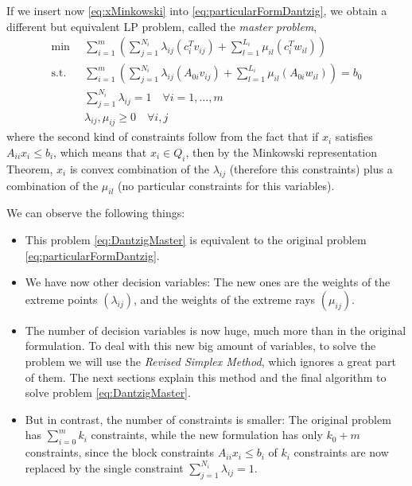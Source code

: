 \documentclass[a4paper,12pt]{article}
\begin{document}
If we insert now \eqref{eq:xMinkowski} into \eqref{eq:particularFormDantzig}, we obtain a different but equivalent LP problem, called the \textit{master problem},
\begin{equation}
\begin{aligned}  
\min \enspace &\sum_{i = 1}^m  \left(\sum_{j=1}^{N_i}  \lambda_{ij}(c_i^Tv_{ij}) + 
	\sum_{l=1}^{L_i} \mu_{il}(c_i^Tw_{il}) \right) \\
\text{s.t.} \enspace &\sum_{i = 1}^m \left(\sum_{j=1}^{N_i}  \lambda_{ij}(A_{0i}v_{ij}) + 	\sum_{l=1}^{L_i} \mu_{il}(A_{0i}w_{il}) \right) = b_0 \\
&\sum_{j = 1}^{N_i} \lambda_{ij} = 1 \quad \forall i = 1,\dots ,m \\
&\lambda_{ij}, \mu_{ij} \geq 0 \quad \forall i,j
\label{eq:DantzigMaster}
\end{aligned}
\end{equation}
where the second kind of constraints follow from the fact that if $x_i$ satisfies  $A_{ii}x_i \leq b_i$, which means that $x_i \in Q_i$, then by the Minkowski representation Theorem, $x_i$ is convex combination of the $\lambda_{ij}$ (therefore this constraints) plus a combination of the $\mu_{il}$ (no particular constraints for this variables).


We can observe the following things:
\begin{itemize}
\item This problem \eqref{eq:DantzigMaster} is equivalent to the original problem \eqref{eq:particularFormDantzig}.
\item We have now other decision variables: The new ones are the weights of the extreme
points $(\lambda_{ij})$, and the weights of the extreme rays $(\mu_{ij})$.
\item The number of decision variables is now huge, much more than in the original formulation. To deal with this new big amount of variables, to solve the problem we will use the \textit{Revised Simplex Method}, which ignores a great part of them. The next sections explain this method and the final algorithm to solve problem \eqref{eq:DantzigMaster}. 
\item But in contrast, the number of constraints is smaller: The original problem has $\sum_{i =0}^m k_i$ constraints, while the new formulation has only $k_0 + m$ constraints, since the block constraints $A_{ii}x_i \leq b_i$ of $k_i$ constraints are now replaced by the single constraint $\sum_{j=1}^{N_i} \lambda_{ij} = 1$. 
\end{itemize}
\end{document}
